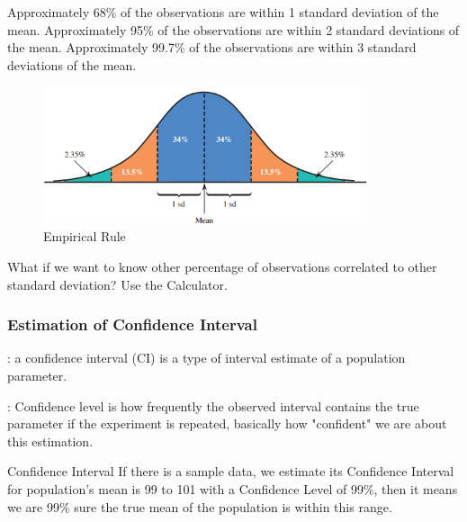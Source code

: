 \begin{description}
Approximately 68\% of the observations are within 1 standard deviation of the
mean.
Approximately 95\% of the observations are within 2 standard deviations of the
mean.
Approximately 99.7\% of the observations are within 3 standard deviations of
the mean.
\begin{figure}[H]
      \centering
    \includegraphics[width=95mm]{er.png}
    \caption{Empirical Rule}
    \label{Figure}
\end{figure}
\end{description}
\begin{Question}
    What if we want to know other percentage of observations correlated to other standard deviation? 
    \solution Use the Calculator.
\end{Question}

\subsubsection{Estimation of Confidence Interval}


\begin{description}
    \item {}: a confidence interval (CI) is a type of interval estimate of a population parameter.
    \item {}: Confidence level is how frequently the observed interval contains the true parameter if the experiment is repeated, basically how "confident" we are about this estimation.
\\
\begin{examplebox}{Confidence Interval}
    If there is a sample data, we estimate its Confidence Interval for population's mean is 99 to 101 with a Confidence Level of 99\%, then it means we are 99\% sure the true mean of the population is within this range.
\end{examplebox}
\end{description}
 
